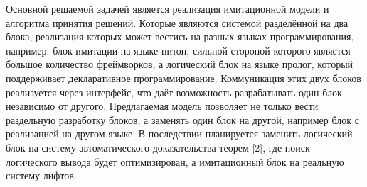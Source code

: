 Основной решаемой задачей является реализация имитационной модели и алгоритма принятия решений. Которые являются системой разделённой на два блока, реализация которых может вестись на разных языках программирования, например: блок имитации на языке питон, сильной стороной которого является большое количество фреймворков, а логический блок на языке пролог, который поддерживает декларативное программирование. Коммуникация этих двух блоков реализуется через интерфейс, что даёт возможность разрабатывать один блок независимо от другого. Предлагаемая модель позволяет не только вести раздельную разработку блоков, а заменять один блок на другой, например блок с реализацией на другом языке. В последствии планируется заменить логический блок на систему автоматического доказательства теорем [2], где поиск логического вывода будет оптимизирован, а имитационный блок на реальную систему лифтов.
